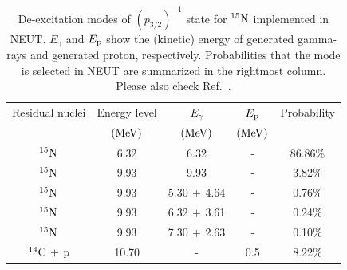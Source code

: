 \begin{table}[H]
	\centering
	\caption[De-excitation modes of $(p_{3/2})^{-1}$ state for $^{15}{\rm N}$ implemented in NEUT]{
	De-excitation modes of $(p_{3/2})^{-1}$ state for $^{15}{\rm N}$ implemented in NEUT.
	$E_{\gamma}$ and $E_{{\rm p}}$ show the (kinetic) energy of generated gamma-rays and generated proton, respectively.
	Probabilities that the mode is selected in NEUT are summarized in the rightmost column.
	Please also check Ref.~\cite{1994Leuschner,1991Ajzenberg}.
	}\label{deex_p3_2_N}
	\vs
	\begin{tabular}{ccccc} \hline \hline
		Residual nuclei            & Energy level  & $E_{\gamma}$    & $E_{{\rm p}}$ & Probability \\
		                           & $({\rm MeV})$ & $({\rm MeV})$   & $({\rm MeV})$ &             \\ \hline
		$^{15}{\rm N}$             & 6.32          & 6.32            & -             & 86.86\%     \\
		$^{15}{\rm N}$             & 9.93          & 9.93            & -             & 3.82\%      \\
		$^{15}{\rm N}$             & 9.93          & 5.30$\,+\,$4.64 & -             & 0.76\%      \\
		$^{15}{\rm N}$             & 9.93          & 6.32$\,+\,$3.61 & -             & 0.24\%      \\
		$^{15}{\rm N}$             & 9.93          & 7.30$\,+\,$2.63 & -             & 0.10\%      \\
		$^{14}{\rm C}\,+\,{\rm p}$ & 10.70         & -               & 0.5           & 8.22\%      \\ \hline \hline
	\end{tabular}
\end{table}

